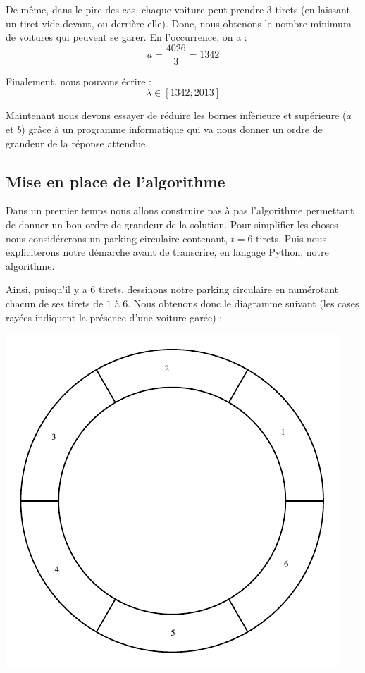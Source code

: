 \documentclass[a4paper,francais,11pt]{article}
\begin{document}
De même, dans le pire des cas, chaque voiture peut prendre $3$ tirets (en laissant un tiret vide devant, ou derrière elle). Donc, nous obtenons le nombre minimum de voitures qui peuvent se garer. En l'occurrence, on a : 
\[a=\frac{4026}{3}=1342\]

Finalement, nous pouvons écrire :
\[\lambda \in [1342;2013]\]

Maintenant nous devons essayer de réduire les bornes inférieure et supérieure ($a$ et $b$) grâce à un programme informatique qui va nous donner un ordre de grandeur de la réponse attendue.
\subsection{Mise en place de l'algorithme}
Dans un premier temps nous allons construire pas à pas l'algorithme permettant de donner un bon ordre de grandeur de la solution. Pour simplifier les choses nous considérerons un parking circulaire contenant, $t=6$ tirets. Puis nous expliciterons notre démarche avant de transcrire, en langage Python, notre algorithme.

Ainsi, puisqu'il y a $6$ tirets, dessinons notre parking circulaire en numérotant chacun de ses tirets de $1$ à $6$. Nous obtenons donc le diagramme suivant (les cases rayées indiquent la présence d'une voiture garée) :
\begin{center}
\includegraphics{fig1.pdf}
\end{center}
\end{document}
